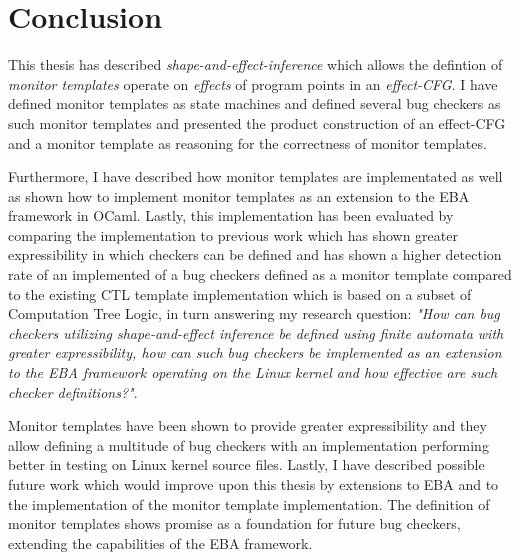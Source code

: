 \section{Conclusion}

This thesis has described \textit{shape-and-effect-inference} which allows the defintion of \textit{monitor templates} operate on \textit{effects} of program points in an \textit{effect-CFG}. I have defined monitor templates as state machines and defined several bug checkers as such monitor templates and presented the product construction of an effect-CFG and a monitor template as reasoning for the correctness of monitor templates. 

\newpar Furthermore, I have described how monitor templates are implementated as well as shown how to implement monitor templates as an extension to the EBA framework in OCaml. Lastly, this implementation has been evaluated by comparing the implementation to previous work which has shown greater expressibility in which checkers can be defined and has shown a higher detection rate of an implemented of a bug checkers defined as a monitor template compared to the existing CTL template implementation which is based on a subset of Computation Tree Logic, in turn answering my research question: \textit{"How can bug checkers utilizing shape-and-effect inference be defined using finite automata with greater expressibility, how can such bug checkers be implemented as an extension to the EBA framework operating on the Linux kernel and how effective are such checker definitions?"}.

\newpar Monitor templates have been shown to provide greater expressibility and they allow defining a multitude of bug checkers with an implementation performing better in testing on Linux kernel source files. Lastly, I have described possible future work which would improve upon this thesis by extensions to EBA and to the implementation of the monitor template implementation. The definition of monitor templates shows promise as a foundation for future bug checkers, extending the capabilities of the EBA framework. 